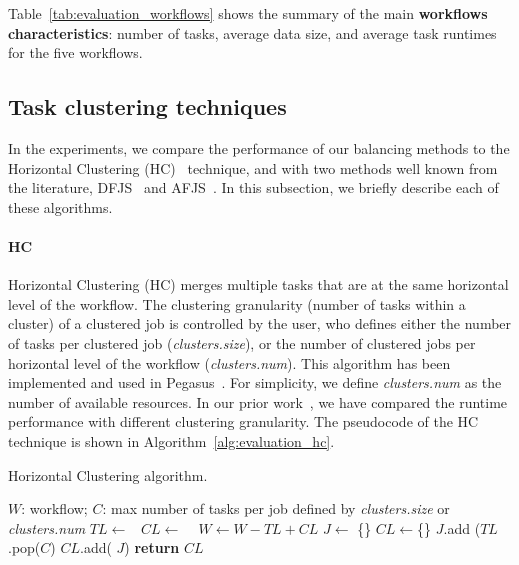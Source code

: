 Table~\ref{tab:evaluation_workflows} shows the summary of the main \textbf{workflows characteristics}: number of tasks, average data size, and average task runtimes for the five workflows. 


\subsection{Task clustering techniques}

In the experiments, we compare the performance of our balancing methods to the Horizontal Clustering (HC)~\cite{Singh:2008:WTC:1341811.1341822} technique, and with two methods well known from the literature, DFJS~\cite{Muthuvelu:2005:DJG:1082290.1082297} and AFJS~\cite{Liu2009}. In this subsection, we briefly describe each of these algorithms.


\paragraph{\textbf{HC}}
Horizontal Clustering (HC) merges multiple tasks that are at the same horizontal level of the workflow. The clustering granularity (number of tasks within a cluster) of a clustered job is controlled by the user, who defines either the number of tasks per clustered job (\emph{clusters.size}), or the number of clustered jobs per horizontal level of the workflow (\emph{clusters.num}). This algorithm has been implemented and used in Pegasus~\cite{Singh:2008:WTC:1341811.1341822}. For simplicity, we define \emph{clusters.num} as the number of available resources. In our prior work~\cite{6683907}, we have compared the runtime performance with different clustering granularity. The pseudocode of the HC technique is shown in Algorithm~\ref{alg:evaluation_hc}. 


\begin{algorithm}[!htb]
	\footnotesize
	\caption{Horizontal Clustering algorithm.}
	\label{alg:evaluation_hc}
	\begin{algorithmic}[1]
		\Require $W$: workflow; $C$: max number of tasks per job defined by \emph{clusters.size} or \emph{clusters.num}
				\State $TL\gets $\  
				\State $CL\gets$  \  
				\State $W \gets W - TL + CL$   
			\EndFor
		\EndProcedure
			\State $J\gets$ \{\}
			\State $CL\gets$\{\}
				\State $J$.add ($TL$.pop($C$) 
				\State  $CL$.add( $J$)
			\EndWhile
			\State \textbf{return} $CL$
		\EndProcedure
	\end{algorithmic}
\end{algorithm}


